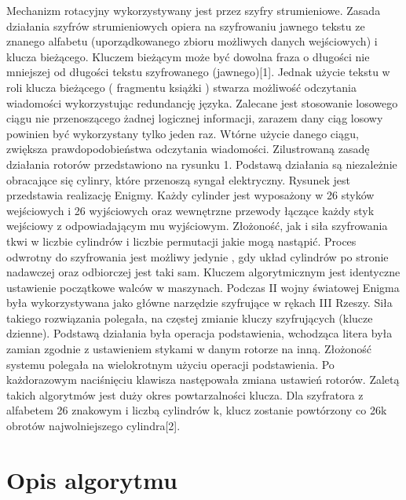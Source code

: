 \documentclass[11pt,a4paper,polish]{article}
\begin{document}
Mechanizm rotacyjny wykorzystywany jest przez szyfry strumieniowe. Zasada
działania szyfrów strumieniowych opiera na szyfrowaniu jawnego tekstu ze 
znanego alfabetu (uporządkowanego zbioru możliwych danych wejściowych) i klucza
bieżącego. Kluczem bieżącym może być dowolna fraza o długości nie mniejszej
od długości tekstu szyfrowanego (jawnego)[1]. Jednak użycie tekstu w roli klucza bieżącego ( fragmentu książki ) stwarza możliwość odczytania wiadomości
wykorzystując redundancję języka. Zalecane jest stosowanie losowego ciągu nie
przenoszącego żadnej logicznej informacji, zarazem dany ciąg losowy powinien
być wykorzystany tylko jeden raz. Wtórne użycie danego ciągu, zwiększa prawdopodobieństwa odczytania wiadomości.
Zilustrowaną zasadę działania rotorów przedstawiono na rysunku 1. Podstawą
działania są niezależnie obracające się cylinry, które przenoszą syngał elektryczny. Rysunek jest przedstawia realizację Enigmy. Każdy cylinder jest wyposażony
w 26 styków wejściowych i 26 wyjściowych oraz wewnętrzne przewody łączące
każdy styk wejściowy z odpowiadającym mu wyjściowym. Złożoność, jak i siła
szyfrowania tkwi w liczbie cylindrów i liczbie permutacji jakie mogą nastąpić.
Proces odwrotny do szyfrowania jest możliwy jedynie , gdy układ cylindrów
po stronie nadawczej oraz odbiorczej jest taki sam. Kluczem algorytmicznym
jest identyczne ustawienie początkowe walców w maszynach. Podczas II wojny światowej Enigma była wykorzystywana jako główne narzędzie szyfrujące w
rękach III Rzeszy. Siła takiego rozwiązania polegała, na częstej zmianie kluczy
szyfrujących (klucze dzienne). Podstawą działania była operacja podstawienia,
wchodząca litera była zamian zgodnie z ustawieniem stykami w danym rotorze
na inną. Złożoność systemu polegała na wielokrotnym użyciu operacji podstawienia. Po każdorazowym naciśnięciu klawisza następowała zmiana ustawień
rotorów.
Zaletą takich algorytmów jest duży okres powtarzalności klucza. Dla szyfratora
z alfabetem 26 znakowym i liczbą cylindrów k, klucz zostanie powtórzony co
26k obrotów najwolniejszego cylindra[2].


\section{Opis algorytmu}

\end{document}
